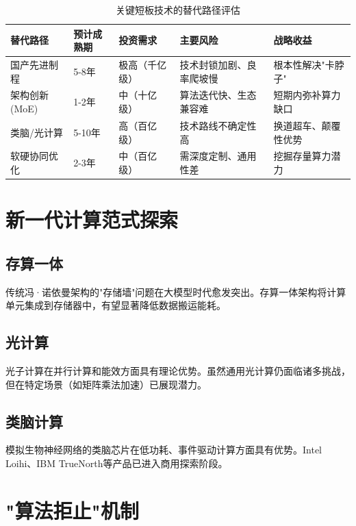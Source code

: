 \begin{table}[H]
\centering
\caption{关键短板技术的替代路径评估}
\small
\begin{tabular}{p{2.2cm}p{2cm}p{2cm}p{2.8cm}p{2.8cm}}
\toprule
\textbf{替代路径} & \textbf{预计成熟期} & \textbf{投资需求} & \textbf{主要风险} & \textbf{战略收益} \\
\midrule
国产先进制程 & 5-8年 & 极高（千亿级） & 技术封锁加剧、良率爬坡慢 & 根本性解决"卡脖子" \\
架构创新(MoE) & 1-2年 & 中（十亿级） & 算法迭代快、生态兼容难 & 短期内弥补算力缺口 \\
类脑/光计算 & 5-10年 & 高（百亿级） & 技术路线不确定性高 & 换道超车、颠覆性优势 \\
软硬协同优化 & 2-3年 & 中（百亿级） & 需深度定制、通用性差 & 挖掘存量算力潜力 \\
\bottomrule
\end{tabular}
\end{table}

\section{新一代计算范式探索}

\subsection{存算一体}

传统冯·诺依曼架构的"存储墙"问题在大模型时代愈发突出。存算一体架构将计算单元集成到存储器中，有望显著降低数据搬运能耗。

\subsection{光计算}

光子计算在并行计算和能效方面具有理论优势。虽然通用光计算仍面临诸多挑战，但在特定场景（如矩阵乘法加速）已展现潜力。

\subsection{类脑计算}

模拟生物神经网络的类脑芯片在低功耗、事件驱动计算方面具有优势。Intel Loihi、IBM TrueNorth等产品已进入商用探索阶段。

\section{"算法拒止"机制}

